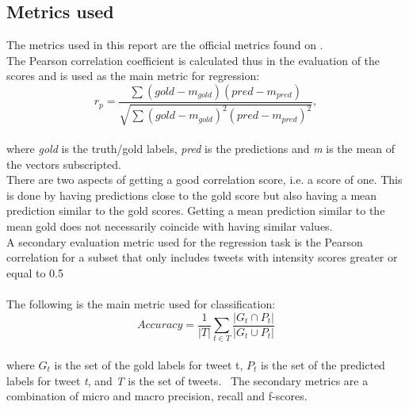 \subsection{Metrics used} \label{sec:metrics}
The metrics used in this report are the official metrics found on \cite{codalab}. \\
The Pearson correlation coefficient is calculated thus in the evaluation of the scores and is used as the main metric for regression:\\
\begin{equation} \label{eq:pearson}
r_{p} = \dfrac{\sum \left(gold-m_{gold}\right) \left(pred-m_{pred}\right)}{\sqrt{\sum \left(gold-m_{gold}\right)^{2} \left(pred-m_{pred}\right)^{2}}},
\end{equation}\\
where \textit{gold} is the truth/gold labels, \textit{pred} is the predictions and \textit{m} is the mean of the vectors subscripted.\\
There are two aspects of getting a good correlation score, i.e. a score of one. This is done by having predictions close to the gold score but also having a mean prediction similar to the gold scores. Getting a mean prediction similar to the mean gold does not necessarily coincide with having similar values.\\
A secondary evaluation metric used for the regression task is the Pearson correlation for a subset that only includes tweets with intensity scores greater or equal to 0.5 \\ \\
The following is the main metric used for classification:\\
\begin{equation} \label{eq:accuracy}
Accuracy = \dfrac{1}{\lvert T \rvert} \sum_{t\in T}\dfrac{\lvert G_{t} \cap P_{t}\rvert}{\lvert G_{t} \cup P_{t}\rvert}
\end{equation}\\
where $G_{t}$ is the set of the gold labels for tweet t, $P_{t}$ is the set of the predicted labels for tweet \textit{t}, and \textit{T} is the set of tweets. \
The secondary metrics are a combination of micro and macro precision, recall and f-scores.